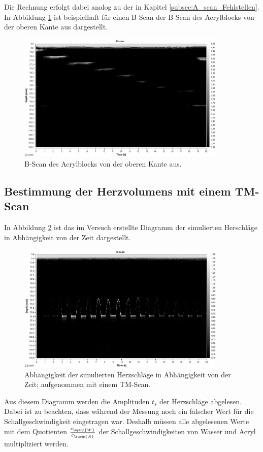 Die Rechnung erfolgt dabei analog zu der in Kapitel \ref{subsec:A_scan_Fehlstellen}.
In Abbildung \ref{fig:b-scan} ist beispielhaft für einen B-Scan der B-Scan des
Acrylblocks von der oberen Kante aus dargestellt.
\begin{figure}[H]
  \centering
  \includegraphics[width=10cm]{data/Bscanrechtsnachlinkswieinzeichnung.jpg}
  \caption{B-Scan des Acrylblocks von der oberen Kante aus.}
  \label{fig:b-scan}
\end{figure}

\newpage
\subsection{Bestimmung der Herzvolumens mit einem TM-Scan}
\label{subsec:Herzvolumen}


In Abbildung \ref{fig:herzvolumen} ist das im Versuch erstellte Diagramm der
simulierten Herschläge in Abhängigkeit von der Zeit dargestellt.

\begin{figure}[H]
  \centering
  \includegraphics[width=10cm]{data/Herzfrequenz.jpg}
  \caption{Abhängigkeit der simulierten Herzschläge in Abhängigkeit von der Zeit; aufgenommen
  mit einem TM-Scan.}
  \label{fig:herzvolumen}
\end{figure}

Aus diesem Diagramm werden die Amplituden $t_s$ der Herzschläge abgelesen. Dabei
ist zu beachten, dass während der Messung noch ein falscher Wert für die Schallgeschwindigkeit
eingetragen war. Deshalb müssen alle abgelesenen Werte mit dem Quotienten
$\frac{c_{\symup{W}}}{c_{\symup{A}}}$ der Schallgeschwindigkeiten von Wasser
und Acryl multipliziert werden.

